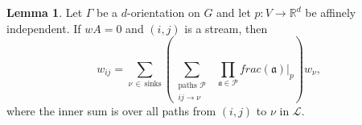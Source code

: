 \documentclass[11pt,letterpaper]{amsart}
\theoremstyle{definition}
\newtheorem{lemma}{Lemma}
\begin{document}
\begin{lemma}\label{lemma:stream-formula-new}
    Let $\Gamma$ be a $d$-orientation on $G$ and let $p:V \to \mathbb{R}^d$ be affinely independent. If $wA=0$ and $(i,j)$ is a stream, then
    \begin{equation}\label{eqn:stream-formula-new}
        w_{ij} = \sum_{\nu \, \in \, \text{sinks}} \left( \sum_{\substack{\text{paths } \mathcal{P} \\ ij \to \nu}} \,\,\, \prod_{\mathfrak{a} \in \mathcal{P}} frac(\mathfrak{a})|_p \right) w_\nu,
    \end{equation}
    where the inner sum is over all paths from $(i,j)$ to $\nu$ in $\mathcal{L}$. 
\end{lemma}
\end{document}
